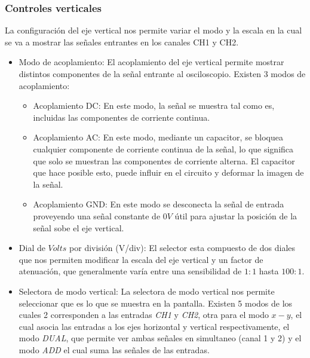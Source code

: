 \subsubsection{Controles verticales}
    
La configuración del eje vertical nos permite variar el modo y la escala en la cual se va a mostrar las señales entrantes en los canales CH1 y CH2.
    
    \begin{itemize}
            \item Modo de acoplamiento: El acoplamiento del eje vertical permite mostrar distintos componentes de la señal entrante al osciloscopio. Existen 3 modos de acoplamiento:
            \begin{itemize}
                \item Acoplamiento DC: En este modo, la señal se muestra tal como es, incluidas las componentes de corriente continua.
                \item Acoplamiento AC: En este modo, mediante un capacitor, se bloquea cualquier componente de corriente continua de la señal, lo que significa que solo se muestran las componentes de corriente alterna. El capacitor que hace posible esto, puede influir en el circuito y deformar la imagen de la señal.
                \item Acoplamiento GND:
                En este modo se desconecta  la señal de entrada proveyendo una señal constante de $0V$ útil para ajustar la posición de la señal sobe el eje vertical.
        \end{itemize}
        
        \item Dial de $Volts$ por división (V/div): El selector esta compuesto de dos diales que nos permiten modificar la escala del eje vertical y un factor de atenuación, que generalmente varía entre una sensibilidad de $1:1$ hasta $100:1$.
        \item Selectora de modo vertical: La selectora de modo vertical nos permite seleccionar que es lo que se muestra en la pantalla. Existen 5 modos de los cuales 2 corresponden a las entradas \textit{CH1} y \textit{CH2}, otra para el modo $x-y$, el cual asocia las entradas a los ejes horizontal y vertical respectivamente, el modo \textit{DUAL}, que permite ver ambas señales en simultaneo (canal 1 y 2) y el modo \textit{ADD} el cual suma las señales de las entradas.       
\end{itemize}

